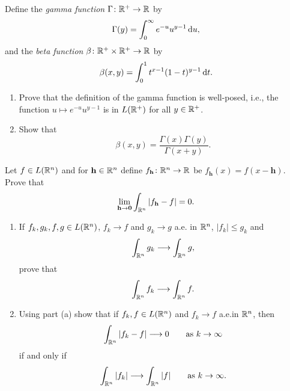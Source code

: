 \begin{problem}
  Define the \emph{gamma function} \(\Gamma\colon\mathbb{R}^+\to\mathbb{R}\) by
\[
\Gamma(y)=\int_0^\infty e^{-u}u^{y-1}\mathop{}\!\mathrm{d} u,
\]
and the \emph{beta function} \(\beta\colon\mathbb{R}^+\times\mathbb{R}^+\to\mathbb{R}\) by
\[
\beta(x,y)=\int_0^1 t^{x-1}(1-t)^{y-1}\mathop{}\!\mathrm{d} t.
\]
\begin{enumerate}[label=(\alph*),noitemsep]
\item Prove that the definition of the gamma function is well-posed, i.e.,
  the function \(u\mapsto e^{-u}u^{y-1}\) is in \(L(\mathbb{R}^+)\) for all
  \(y\in\mathbb{R}^+\).
\item Show that
\[
\beta(x,y)=\frac{\Gamma(x)\Gamma(y)}{\Gamma(x+y)}.
\]
\end{enumerate}
\end{problem}
\begin{solution}
\end{solution}

\begin{problem}
  Let \(f\in L(\mathbb{R}^n)\) and for \(\mathbf{h}\in\mathbb{R}^n\) define
  \(f_{\mathbf{h}}\colon\mathbb{R}^n\to\mathbb{R}\) be
  \(f_{\mathbf{h}}( x )= f( x -\mathbf{h})\). Prove that
\[
\lim_{\mathbf{h}\to\mathbf{0}}\int_{\mathbb{R}^n}\left|f_{\mathbf{h}}-f\right|=0.
\]
\end{problem}
\begin{solution}
\end{solution}

\begin{problem}
\begin{enumerate}[label=(\alph*),noitemsep]
\item If \(f_k,g_k,f,g\in L(\mathbb{R}^n)\), \(f_k\to f\) and \(g_k\to g\) a.e.\@
  in \(\mathbb{R}^n\), \(|f_k|\leq g_k\) and
\[
\int_{\mathbb{R}^n}g_k\longrightarrow\int_{\mathbb{R}^n}g,
\]
prove that
\[
\int_{\mathbb{R}^n} f_k\longrightarrow\int_{\mathbb{R}^n}f.
\]
\item Using part (a) show that if \(f_k,f\in L(\mathbb{R}^n)\) and \(f_k\to f\)
  a.e.\@ in \(\mathbb{R}^n\), then
\[
  \int_{\mathbb{R}^n}|f_k-f|\longrightarrow 0\qquad\text{as \(k\to\infty\)}
\]
if and only if
\[
  \int_{\mathbb{R}^n}|f_k|\longrightarrow\int_{\mathbb{R}^n}|f|\qquad\text{as
    \(k\to\infty\)}.
\]
\end{enumerate}
\end{problem}
\begin{solution}
\end{solution}

